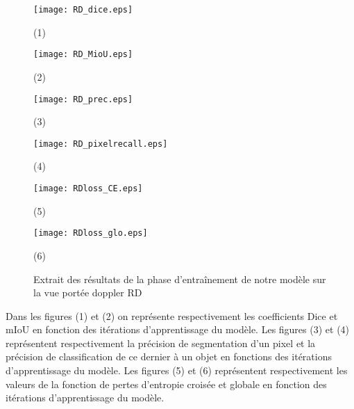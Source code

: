 \newpage
\begin{figure}[hbt!]
  \centering
  \begin{minipage}{0.45\linewidth}
    \centering
    \texttt{[image: RD\_dice.eps]}
    \caption{(1)}
  \end{minipage}
  \begin{minipage}{0.45\linewidth}
    \texttt{[image: RD\_MioU.eps]}   
   \caption{(2)}
  \end{minipage}
  \hfill
  \begin{minipage}{0.45\linewidth}
    \centering
    \texttt{[image: RD\_prec.eps]}
    \caption{(3)}
  \end{minipage}
  \begin{minipage}{0.45\linewidth}

    \texttt{[image: RD\_pixelrecall.eps]}
    \caption{(4)}
  \end{minipage}
  \begin{minipage}{0.45\linewidth}
    \centering
    \texttt{[image: RDloss\_CE.eps]}
    \caption{(5)}
  \end{minipage}
  \begin{minipage}{0.45\linewidth}
    \texttt{[image: RDloss\_glo.eps]}
    \caption{(6)}
  \end{minipage}
  \caption{Extrait des résultats de la phase d'entraînement de notre modèle sur la vue portée doppler RD}
  \label{fig:422}
\end{figure}
Dans les figures (1) et (2) on représente respectivement les coefficients Dice et mIoU en fonction des itérations d'apprentissage du modèle. Les figures (3) et (4) représentent respectivement la précision de segmentation d'un pixel et la précision de classification de ce dernier à un objet en fonctions des itérations d'apprentissage du modèle. Les figures (5) et (6) représentent respectivement les valeurs de la fonction de pertes d'entropie croisée et globale en fonction des itérations d'apprentissage du modèle.

